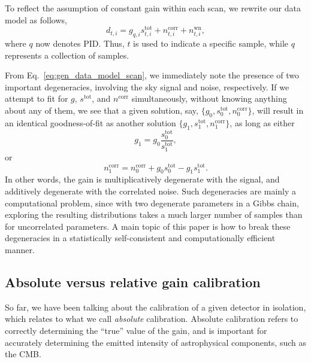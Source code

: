 \documentclass[twocolumn]{aa}
\newcommand{\ti}[0]{_{t, i}}
\newcommand{\qi}[0]{_{q, i}}
\newcommand{\tot}[0]{^{\mathrm{tot}}}
\newcommand{\corr}[0]{^{\mathrm{corr}}}
\newcommand{\wn}[0]{^{\mathrm{wn}}}
\begin{document}
To reflect the assumption of constant gain within each scan, we rewrite our data model as follows,
\begin{equation}
    d\ti = g\qi s\ti\tot + n\ti\corr + n\ti\wn,
    \label{eq:gen_data_model_scan}
\end{equation}
where $q$ now denotes PID. Thus, $t$ is used to indicate a specific sample, while $q$ represents a collection of samples.

From Eq.~\eqref{eq:gen_data_model_scan}, we immediately note the presence of two important degeneracies, involving the sky signal and noise, respectively. If we attempt to fit for $g$, $s\tot$, and $n\corr$ simultaneously, without knowing anything about any of them, we see that a given solution, say, $\{g_0, s_0\tot, n_0\corr\}$, will result in an identical goodness-of-fit as another solution $\{g_1, s_1\tot, n_1\corr\}$, as long as either
\begin{equation}
  g_1 = g_0\frac{s_0\tot}{s_1\tot},
\end{equation}
or
\begin{equation}
  n_1\corr = n_0\corr + g_0s_0\tot - g_1 s_1\tot.
\end{equation}
In other words, the gain is multiplicatively degenerate with the
signal, and additively degenerate with the correlated noise. Such
degeneracies are mainly a computational problem, since with two degenerate parameters in a Gibbs chain, exploring the resulting distributions takes a much larger number of samples than for uncorrelated parameters. A main topic of this
paper is how to break these degeneracies in a statistically
self-consistent and computationally efficient manner.

\subsection{Absolute versus relative gain calibration}
\label{sec:absrelgain}
So far, we have been talking about the calibration of a given detector in isolation, which relates to what we call \emph{absolute} calibration. Absolute calibration refers to correctly determining the ``true'' value of the gain, and is important for accurately determining the emitted intensity of astrophysical components, such as the CMB.
\end{document}
